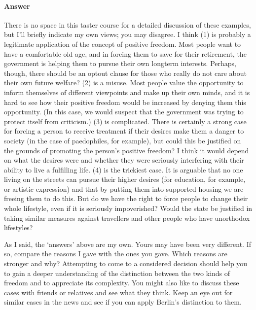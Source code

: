 \documentclass[letterpaper,10pt,english]{sphinxmanual}
\begin{document}
\paragraph{Answer}
\label{\detokenize{content/session_00/Part_00_02:id6}}
There is no space in this taster course for a detailed discussion of these examples, but I’ll briefly indicate my own views; you may disagree. I think (1) is probably a legitimate application of the concept of positive freedom. Most people want to have a comfortable old age, and in forcing them to save for their retirement, the government is helping them to pursue their own long\sphinxhyphen{}term interests. Perhaps, though, there should be an opt\sphinxhyphen{}out clause for those who really do not care about their own
future welfare? (2) is a misuse. Most people value the opportunity to inform themselves of different viewpoints and make up their own minds, and it is hard to see how their positive freedom would be increased by denying them this opportunity. (In this case, we would suspect that the government was trying to protect itself from criticism.) (3) is complicated. There is certainly a strong case for forcing a person to receive treatment if their desires make them a danger to society (in the case of
paedophiles, for example), but could this be justified on the grounds of promoting the person’s  positive freedom? I think it would depend on what the desires were and whether they were seriously interfering with their ability to live a fulfilling life. (4) is the trickiest case. It is arguable that no one living on the streets can pursue their higher desires (for education, for example, or artistic expression) and that by putting them into supported housing we are freeing them to do this.
But do we have the right to force people to change their whole lifestyle, even if it is seriously impoverished? Would the state be justified in taking similar measures against travellers and other people who have unorthodox lifestyles?

As I said, the ‘answers’ above are my own. Yours may have been very different. If so, compare the reasons I gave with the ones you gave. Which reasons are stronger and why? Attempting to come to a considered decision should help you to gain a deeper understanding of the distinction between the two kinds of freedom and to appreciate its complexity. You might also like to discuss these cases with friends or relatives and see what they think. Keep an eye out for similar cases in the news and see if
you can apply Berlin’s distinction to them.
\end{document}
